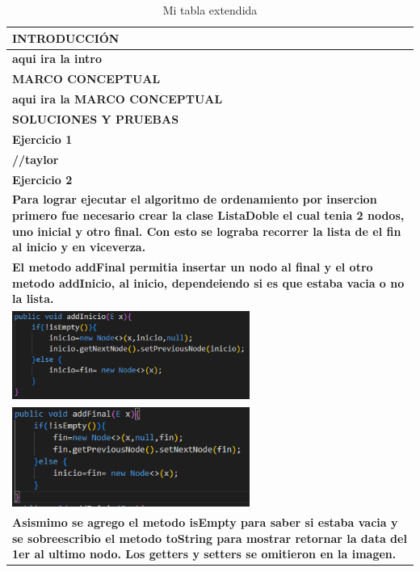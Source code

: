 \documentclass[9pt]{article}
\begin{document}
	\begin{longtable}{|p{15cm}|}
			\caption{Mi tabla extendida}\\
			\hline 
			\rowcolor{tablebackground}
			\color{white}\textbf{INTRODUCCIÓN}  \\
			\hline 
			\textbf{aqui ira la intro}  \\
			\hline 
			\rowcolor{tablebackground}
			\color{white}\textbf{MARCO CONCEPTUAL}  \\
			\hline 
			\textbf{aqui ira la MARCO CONCEPTUAL}  \\
			\hline 
			\rowcolor{tablebackground}
			\color{white}\textbf{SOLUCIONES Y PRUEBAS}  \\
			\hline 
			\textbf{Ejercicio 1}  \\
			\textbf{//taylor}  \\
			\textbf{Ejercicio 2}  \\
			\textbf{Para lograr ejecutar el algoritmo de ordenamiento por insercion 
			primero fue necesario crear la clase ListaDoble el cual tenia 2 nodos,
			uno inicial y otro final. Con esto se lograba recorrer la lista de el
			fin al inicio y en viceverza.}  \\
			\textbf{El metodo addFinal permitia insertar un nodo al final y el otro
			metodo addInicio, al inicio, dependeiendo si es que estaba vacia o no la lista.}  \\
			\includegraphics[width=0.6\textwidth,keepaspectratio]{img/addInicio.png}\\
			\includegraphics[width=0.6\textwidth,keepaspectratio]{img/addFinal.png}\\
			\textbf{Asismimo se agrego el metodo isEmpty para saber si estaba vacia 
			y se sobreescribio el metodo toString para mostrar retornar la data 
			del 1er al ultimo nodo. Los getters y setters se omitieron en la imagen.}\\

\end{longtable}
\end{document}
